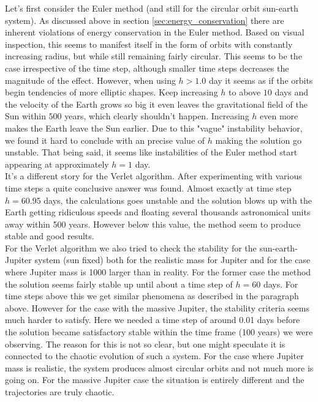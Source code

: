 \documentclass[12pt]{article}
\numberwithin{figure}{section}
\numberwithin{table}{section}
\begin{document}
\noindent Let's first consider the Euler method (and still for the circular orbit sun-earth system). As discussed above in section \ref{sec:energy_conservation} there are inherent violations of energy conservation in the Euler method. Based on visual inspection, this seems to manifest itself in the form of orbits with constantly increasing radius, but while still remaining fairly circular. This seems to be the case irrespective of the time step, although smaller time steps decreases the magnitude of the effect. However, when using $h>1.0$ day it seems as if the orbits begin tendencies of more elliptic shapes. Keep increasing $h$ to above $10$ days and the velocity of the Earth grows so big it even leaves the gravitational field of the Sun within $500$ years, which clearly shouldn't happen. Increasing $h$ even more makes the Earth leave the Sun earlier. Due to this "vague" instability behavior, we found it hard to conclude with an precise value of $h$ making the solution go unstable. That being said, it seems like instabilities of the Euler method start appearing at approximately $h=1$ day.\\

\noindent It's a different story for the Verlet algorithm. After experimenting with various time steps a quite conclusive answer was found. Almost exactly at time step $h=60.95$ days, the calculations goes unstable and the solution blows up with the Earth getting ridiculous speeds and floating several thousands astronomical units away within 500 years. However below this value, the method seem to produce stable and good results. \\

\noindent For the Verlet algorithm we also tried to check the stability for the sun-earth-Jupiter system (sun fixed) both for the realistic mass for Jupiter and for the case where Jupiter mass is 1000 larger than in reality. For the former case the method the solution seems fairly stable up until about a time step of $h=60$ days. For time steps above this we get similar phenomena as described in the paragraph above. However for the case with the massive Jupiter, the stability criteria seems much harder to satisfy. Here we needed a time step of around 0.01 days before the solution became satisfactory stable within the time frame (100 years) we were observing. The reason for this is not so clear, but one might speculate it is connected to the chaotic evolution of such a system. For the case where Jupiter mass is realistic, the system produces almost circular orbits and not much more is going on. For the massive Jupiter case the situation is entirely different and the trajectories are truly chaotic.
\end{document}
